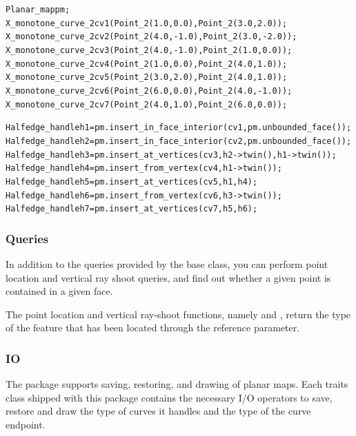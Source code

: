 \begin{alltt}
  Planar_map pm;
  X_monotone_curve_2 cv1(Point_2(1.0, 0.0), Point_2(3.0, 2.0));
  X_monotone_curve_2 cv2(Point_2(4.0, -1.0), Point_2(3.0, -2.0));
  X_monotone_curve_2 cv3(Point_2(4.0, -1.0), Point_2(1.0, 0.0));
  X_monotone_curve_2 cv4(Point_2(1.0, 0.0), Point_2(4.0, 1.0));
  X_monotone_curve_2 cv5(Point_2(3.0, 2.0), Point_2(4.0, 1.0));
  X_monotone_curve_2 cv6(Point_2(6.0, 0.0), Point_2(4.0, -1.0));
  X_monotone_curve_2 cv7(Point_2(4.0, 1.0), Point_2(6.0, 0.0));

  Halfedge_handle h1 = pm.insert_in_face_interior(cv1, pm.unbounded_face());
  Halfedge_handle h2 = pm.insert_in_face_interior(cv2, pm.unbounded_face());
  Halfedge_handle h3 = pm.insert_at_vertices(cv3, h2->twin(), h1->twin());
  Halfedge_handle h4 = pm.insert_from_vertex(cv4, h1->twin());
  Halfedge_handle h5 = pm.insert_at_vertices(cv5, h1, h4);
  Halfedge_handle h6 = pm.insert_from_vertex(cv6, h3->twin());
  Halfedge_handle h7 = pm.insert_at_vertices(cv7, h5, h6);
\end{alltt}


\subsubsection{Queries}

In addition to the queries provided by the 
base class, you can perform point location and vertical ray shoot
queries, and find out whether a given point is contained in a given
face.

The point location and vertical ray-shoot functions, namely
and
,
return the type of the feature that has been located through the
 reference parameter.

\subsubsection{IO}
The  package supports saving, restoring, and drawing
of planar maps. Each traits class shipped with this package contains
the necessary I/O operators to save, restore and draw the type of
curves it handles and the type of the curve endpoint.

